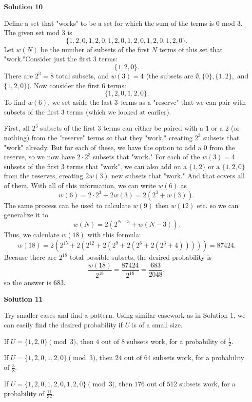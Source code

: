 \begin{enumerate}
 



\textbf{Solution 10}

Define a set that "works" to be a set for which the sum of the terms is $0$ mod $3$. The given set mod $3$ is
 \[\{1,2,0,1,2,0,1,2,0,1,2,0,1,2,0,1,2,0\}.\]Let $w(N)$ be the number of subsets of the first $N$ terms of this set that "work."Consider just the first $3$ terms:
 \[\{1,2,0\}.\]There are $2^3=8$ total subsets, and $w(3)=4$ (the subsets are $\emptyset, \{0\}, \{1,2\},$ and $\{1,2,0\}$). Now consider the first $6$ terms:
 \[\{1,2,0,1,2,0\}.\]To find $w(6)$, we set aside the last $3$ terms as a "reserve" that we can pair with subsets of the first $3$ terms (which we looked at earlier). 

 First, all $2^3$ subsets of the first $3$ terms can either be paired with a $1$ or a $2$ (or nothing) from the "reserve" terms so that they "work," creating $2^3$ subsets that "work" already. But for each of these, we have the option to add a $0$ from the reserve, so we now have $2\cdot2^3$ subsets that "work." For each of the $w(3)=4$ subsets of the first $3$ terms that "work", we can also add on a $\{1,2\}$ or a $\{1,2,0\}$ from the reserves, creating $2w(3)$ new subsets that "work." And that covers all of them. With all of this information, we can write $w(6)$ as
 \[w(6)=2\cdot2^3+2w(3)=2(2^3+w(3)).\]The same process can be used to calculate $w(9)$ then $w(12)$ etc. so we can generalize it to
 \[w(N)=2(2^{N-3}+w(N-3)).\]Thus, we calculate $w(18)$ with this formula:
 \[w(18)=2( 2^{15} + 2( 2^{12} + 2( 2^9 + 2( 2^6 + 2( 2^3 + 4 ) ) ) ) )=87424.\]Because there are $2^{18}$ total possible subsets, the desired probability is
 \[\frac{w(18)}{2^{18}}=\frac{87424}{2^{18}}=\frac{683}{2048},\]so the answer is $\boxed{683}.$




\textbf{Solution 11}

Try smaller cases and find a pattern. Using similar casework as in Solution 1, we can easily find the desired probability if $U$ is of a small size. 

 If $U = \{ 1,2,0\} \pmod 3$, then $4$ out of $8$ subsets work, for a probability of $\frac12$.

 If $U = \{ 1,2,0,1,2,0\} \pmod 3$, then $24$ out of $64$ subsets work, for a probability of $\frac38$.

 If $U = \{ 1,2,0,1,2,0,1,2,0\} \pmod 3$, then $176$ out of $512$ subsets work, for a probability of $\frac{11}{32}$.


\end{enumerate}
